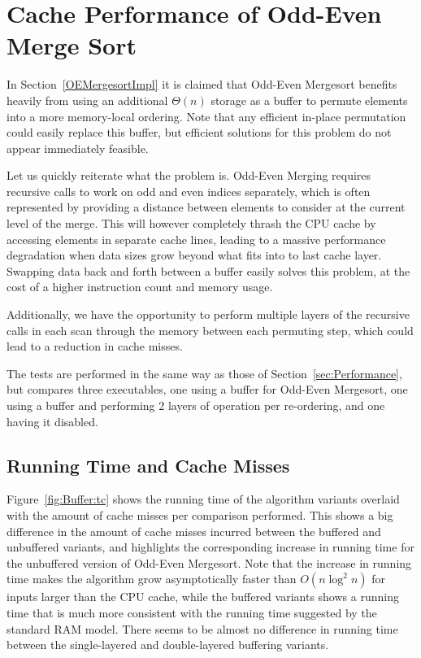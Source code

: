 \FloatBarrier
\section{Cache Performance of Odd-Even Merge Sort}
\label{sec:OEMergesortExperiment}

In Section~\ref{OEMergesortImpl} it is claimed that Odd-Even Mergesort benefits heavily from using an additional $\Theta(n)$ storage as a buffer to permute elements into a more memory-local ordering. Note that any efficient in-place permutation could easily replace this buffer, but efficient solutions for this problem do not appear immediately feasible.

Let us quickly reiterate what the problem is. Odd-Even Merging requires recursive calls to work on odd and even indices separately, which is often represented by providing a distance between elements to consider at the current level of the merge. This will however completely thrash the CPU cache by accessing elements in separate cache lines, leading to a massive performance degradation when data sizes grow beyond what fits into to last cache layer.
Swapping data back and forth between a buffer easily solves this problem, at the cost of a higher instruction count and memory usage.

Additionally, we have the opportunity to perform multiple layers of the recursive calls in each scan through the memory between each permuting step, which could lead to a reduction in cache misses.

The tests are performed in the same way as those of Section~\ref{sec:Performance}, but compares three executables, one using a buffer for Odd-Even Mergesort, one using a buffer and performing 2 layers of operation per re-ordering, and one having it disabled.

\subsection{Running Time and Cache Misses}

Figure~\ref{fig:Buffer:tc} shows the running time of the algorithm variants overlaid with the amount of cache misses per comparison performed. 
This shows a big difference in the amount of cache misses incurred between the buffered and unbuffered variants, and highlights the corresponding increase in running time for the unbuffered version of Odd-Even Mergesort. 
Note that the increase in running time makes the algorithm grow asymptotically faster than $O(n \log^2 n)$ for inputs larger than the CPU cache, while the buffered variants shows a running time that is much more consistent with the running time suggested by the standard RAM model.
There seems to be almost no difference in running time between the single-layered and double-layered buffering variants.

